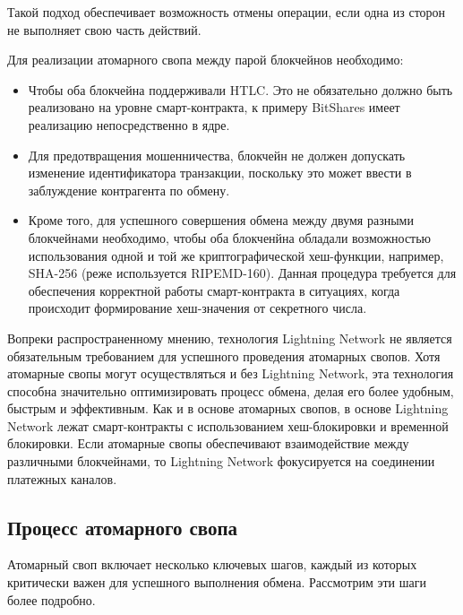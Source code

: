 Такой подход обеспечивает возможность отмены операции, если одна из сторон не выполняет свою часть действий.

Для реализации атомарного свопа между парой блокчейнов необходимо:

\begin{itemize}
\item Чтобы оба блокчейна поддерживали HTLC. Это не обязательно должно быть реализовано на уровне смарт-контракта, к примеру BitShares имеет реализацию непосредственно в ядре.
\item Для предотвращения мошенничества, блокчейн не должен допускать изменение идентификатора транзакции, поскольку это может ввести в заблуждение контрагента по обмену.
\item Кроме того, для успешного совершения обмена между двумя разными блокчейнами необходимо, чтобы оба блокченйна обладали возможностью использования одной и той же криптографической хеш-функции, например, SHA-256 (реже используется RIPEMD-160). Данная процедура требуется для обеспечения корректной работы смарт-контракта в ситуациях, когда происходит формирование хеш-значения от секретного числа.
\end{itemize}

Вопреки распространенному мнению, технология Lightning Network не является обязательным требованием для успешного проведения атомарных свопов. Хотя атомарные свопы могут осуществляться и без Lightning Network, эта технология способна значительно оптимизировать процесс обмена, делая его более удобным, быстрым и эффективным. Как и в основе атомарных свопов, в основе Lightning Network лежат смарт-контракты с использованием хеш-блокировки и временной блокировки. Если атомарные свопы обеспечивают взаимодействие между различными блокчейнами, то Lightning Network фокусируется на соединении платежных каналов\cite{label27}.

\subsection{Процесс атомарного свопа}

Атомарный своп включает несколько ключевых шагов, каждый из которых критически важен для успешного выполнения обмена. Рассмотрим эти шаги более подробно.

